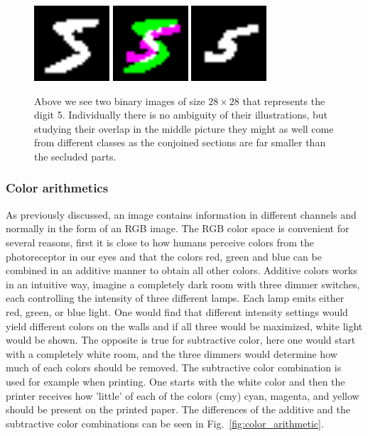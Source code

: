 \begin{figure}[H]
\centering
\includegraphics[width=0.25\textwidth]{figure/computer_vision/images/first.png}
\includegraphics[width=0.25\textwidth]{figure/computer_vision/images/overlap.png}
\includegraphics[width=0.25\textwidth]{figure/computer_vision/images/second.png}
\caption{\label{pic:overlap} Above we see two binary images of size $28 \times 28$ that represents the digit 5. Individually there is no ambiguity of their illustrations, but studying their overlap in the middle picture they might as well come from different classes as the conjoined sections are far smaller than the secluded parts.}
\end{figure}

\subsubsection{Color arithmetics}

As previously discussed, an image contains information in different channels and normally in the form of an RGB image. The RGB color space is convenient for several reasons, first it is close to how humans perceive colors from the photoreceptor in our eyes and that the colors red, green and blue can be combined in an additive manner to obtain all other colors. Additive colors works in an intuitive way, imagine a completely dark room with three dimmer switches, each controlling the intensity of three different lamps. Each lamp emits either red, green, or blue light. One would find that different intensity settings would yield different colors on the walls and if all three would be maximized, white light would be shown. The opposite is true for subtractive color, here one would start with a completely white room, and the three dimmers would determine how much of each colors should be removed. The subtractive color combination is used for example when printing. One starts with the white color and then the printer receives how 'little' of each of the colors (cmy) cyan, magenta, and yellow should be present on the printed paper. The differences of the additive and the subtractive color combinations can be seen in Fig.~\ref{fig:color_arithmetic}.

